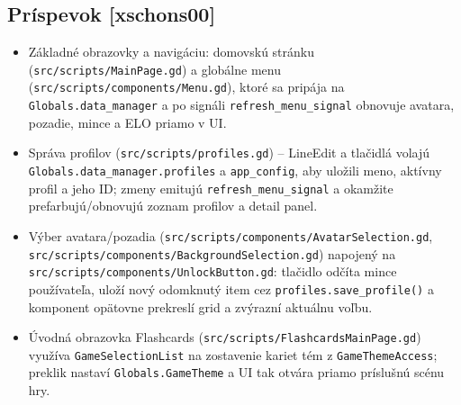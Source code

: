 \documentclass[a4paper,12pt]{article}
\begin{document}
\subsection{Príspevok [xschons00]}
\begin{itemize}
	\item Základné obrazovky a navigáciu: domovskú stránku (\texttt{src/scripts/MainPage.gd}) a globálne menu (\texttt{src/scripts/components/Menu.gd}), ktoré sa pripája na \texttt{Globals.data\_manager} a po signáli \texttt{refresh\_menu\_signal} obnovuje avatara, pozadie, mince a ELO priamo v UI.
	\item Správa profilov (\texttt{src/scripts/profiles.gd}) – LineEdit a tlačidlá volajú \texttt{Globals.data\_manager.profiles} a \texttt{app\_config}, aby uložili meno, aktívny profil a jeho ID; zmeny emitujú \texttt{refresh\_menu\_signal} a okamžite prefarbujú/obnovujú zoznam profilov a detail panel.
	\item Výber avatara/pozadia (\texttt{src/scripts/components/AvatarSelection.gd}, \texttt{src/scripts/components/BackgroundSelection.gd}) napojený na \texttt{src/scripts/components/UnlockButton.gd}: tlačidlo odčíta mince používateľa, uloží nový odomknutý item cez \texttt{profiles.save\_profile()} a komponent opätovne prekreslí grid a zvýrazní aktuálnu voľbu.
	\item Úvodná obrazovka Flashcards (\texttt{src/scripts/FlashcardsMainPage.gd}) využíva \texttt{GameSelectionList} na zostavenie kariet tém z \texttt{GameThemeAccess}; preklik nastaví \texttt{Globals.GameTheme} a UI tak otvára priamo príslušnú scénu hry.
\end{itemize}
\end{document}
